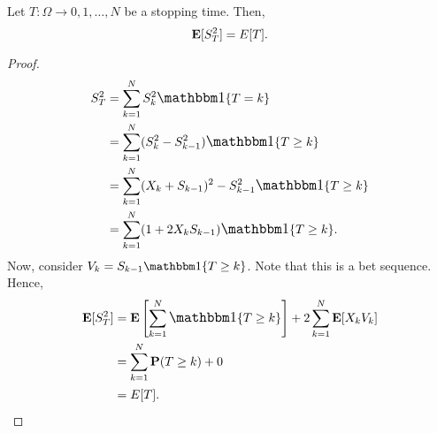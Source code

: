 \documentclass[main]{subfiles}
\begin{document}


\begin{theorem}
    Let $T:\Omega\rightarrow{0,1,\ldots,N}$ be a stopping time. Then,
    $$\mathbf E[S_T^2]=E[T].$$
\end{theorem}
\begin{proof}
    $$
        \begin{aligned}
            S_T^2 & =\sum_{k=1}^N S_k^2 \one\{T=k\}                         \\
                  & =\sum_{k=1}^N (S_k^2-S_{k-1}^2) \one\{T\geq k\}         \\
                  & =\sum_{k=1}^N (X_k+S_{k-1})^2-S_{k-1}^2 \one\{T\geq k\} \\
                  & =\sum_{k=1}^N (1+2X_kS_{k-1}) \one\{T\geq k\}.          \\
        \end{aligned}
    $$
    Now, consider $V_k=S_{k-1} \one\{T\geq k\}$. Note that this is a bet sequence. Hence,
    $$
        \begin{aligned}
            \E[S_T^2] & =\E\left[\sum_{k=1}^N\one\{T\geq k\}\right]+2\sum_{k=1}^N\E[X_k V_k] \\
                      & =\sum_{k=1}^N \P(T\geq k)+0                                          \\
                      & =E[T].
        \end{aligned}
    $$
\end{proof}
\end{document}
